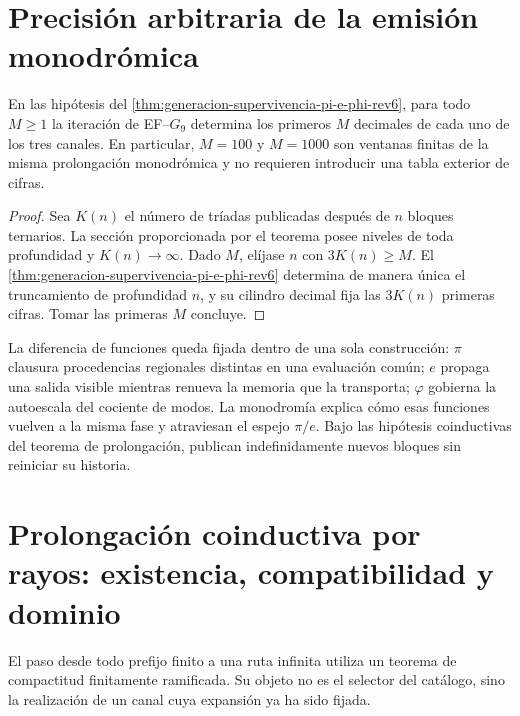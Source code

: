 \section{Precisión arbitraria de la emisión monodrómica}
\label{sec:precision-arbitraria-monodromia-rev6}

\begin{corollary}
\label{cor:precision-arbitraria-monodromia-rev6}
En las hipótesis del
\cref{thm:generacion-supervivencia-pi-e-phi-rev6}, para todo \(M\geq1\) la
iteración de EF--\(G_9\) determina los primeros
\(M\) decimales de cada uno de los tres canales. En particular, \(M=100\)
y \(M=1000\) son ventanas finitas de la misma prolongación monodrómica y no
requieren introducir una tabla exterior de cifras.
\end{corollary}

\begin{proof}
Sea \(K(n)\) el número de tríadas publicadas después de \(n\) bloques
ternarios. La sección proporcionada por el teorema posee niveles de toda
profundidad y \(K(n)\to\infty\). Dado \(M\),
elíjase \(n\) con \(3K(n)\geq M\). El
\cref{thm:generacion-supervivencia-pi-e-phi-rev6} determina de manera única
el truncamiento de profundidad \(n\), y su cilindro decimal fija las
\(3K(n)\) primeras cifras. Tomar las primeras \(M\) concluye.
\end{proof}

La diferencia de funciones queda fijada dentro de una sola construcción:
\(\pi\) clausura procedencias regionales distintas en una evaluación común;
\(e\) propaga una salida visible mientras renueva la memoria que la
transporta; \(\varphi\) gobierna la autoescala del cociente de modos. La
monodromía explica cómo esas funciones vuelven a la misma fase y atraviesan
el espejo \(\pi/e\). Bajo las hipótesis coinductivas del teorema de
prolongación, publican indefinidamente nuevos bloques sin reiniciar su
historia.

\ifdefined\HMTIncludeTargetFedRay
\section{Prolongación coinductiva por rayos: existencia, compatibilidad y dominio}
\label{sec:rayo-coinductivo-rev6}

El paso desde todo prefijo finito a una ruta infinita utiliza un teorema de
compactitud finitamente ramificada. Su objeto no es el selector del catálogo,
sino la realización de un canal cuya expansión ya ha sido fijada.

